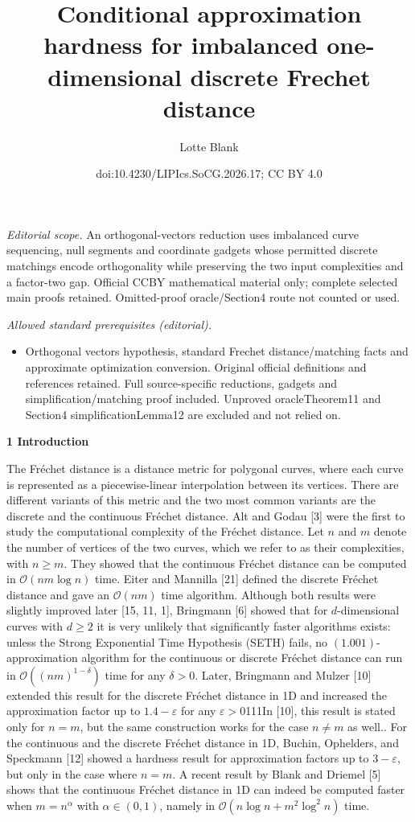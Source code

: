 \documentclass[10pt,a4paper]{article}
\title{Conditional approximation hardness for imbalanced one-dimensional discrete Frechet distance}
\author{Lotte Blank}
\date{doi:10.4230/LIPIcs.SoCG.2026.17; CC BY 4.0}
\begin{document}
\maketitle
\noindent\textit{Editorial scope.} An orthogonal-vectors reduction uses imbalanced curve sequencing, null segments and coordinate gadgets whose permitted discrete matchings encode orthogonality while preserving the two input complexities and a factor-two gap. Official CCBY mathematical material only; complete selected main proofs retained. Omitted-proof oracle/Section4 route not counted or used.\par\medskip
\noindent\textit{Allowed standard prerequisites (editorial).}\begin{itemize}
\item Orthogonal vectors hypothesis, standard Frechet distance/matching facts and approximate optimization conversion. Original official definitions and references retained. Full source-specific reductions, gadgets and simplification/matching proof included. Unproved oracleTheorem11 and Section4 simplificationLemma12 are excluded and not relied on.
\end{itemize}\medskip
\par\medskip\noindent\textbf{1 Introduction}\par
The Fréchet distance is a distance metric for polygonal curves, where each curve is represented as a piecewise-linear interpolation between its vertices. There are different variants of this metric and the two most common variants are the discrete and the continuous Fréchet distance. Alt and Godau [3] were the first to study the computational complexity of the Fréchet distance. Let $n$ and $m$ denote the number of vertices of the two curves, which we refer to as their complexities, with $n\geq m$. They showed that the continuous Fréchet distance can be computed in $\mathcal{O}(nm\log n)$ time. Eiter and Mannilla [21] defined the discrete Fréchet distance and gave an $\mathcal{O}(nm)$ time algorithm. Although both results were slightly improved later [15, 11, 1], Bringmann [6] showed that for $d$-dimensional curves with $d\geq 2$ it is very unlikely that significantly faster algorithms exists: unless the Strong Exponential Time Hypothesis (SETH) fails, no $(1.001)$-approximation algorithm for the continuous or discrete Fréchet distance can run in $\mathcal{O}((nm)^{1-\delta})$ time for any $\delta>0$. Later, Bringmann and Mulzer [10] extended this result for the discrete Fréchet distance in 1D and increased the approximation factor up to $1.4-\varepsilon$ for any $\varepsilon>0$111In [10], this result is stated only for $n=m$, but the same construction works for the case $n\neq m$ as well.. For the continuous and the discrete Fréchet distance in 1D, Buchin, Ophelders, and Speckmann [12] showed a hardness result for approximation factors up to $3-\varepsilon$, but only in the case where $n=m$. A recent result by Blank and Driemel [5] shows that the continuous Fréchet distance in 1D can indeed be computed faster when $m=n^{\alpha}$ with $\alpha\in(0,1)$, namely in $\mathcal{O}(n\log n+m^{2}\log^{2}n)$ time.
\end{document}
